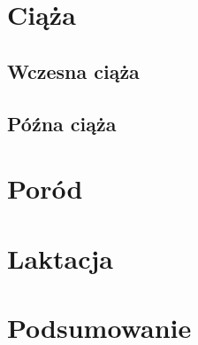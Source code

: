 \documentclass[two column, twoside, a4paper]{article}
\begin{document}
\blindtext
\section{Ciąża}

\blindtext
\subsection{Wczesna ciąża}

\blindtext
\subsection{Późna ciąża}

\blindtext
\section{Poród}

\blindtext
\section{Laktacja}

\blindtext
\section{Podsumowanie}

\blindtext

\printbibliography
\end{document}
